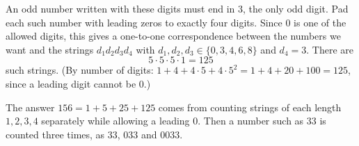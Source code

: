 An odd number written with these digits must end in $3$, the only odd digit. Pad each such number with leading zeros to exactly four digits. Since $0$ is one of the allowed digits, this gives a one-to-one correspondence between the numbers we want and the strings $d_1d_2d_3d_4$ with $d_1,d_2,d_3\in\{0,3,4,6,8\}$ and $d_4=3$. There are
\[
5\cdot5\cdot5\cdot1=\boxed{125}
\]
such strings. (By number of digits: $1+4+4\cdot5+4\cdot5^2=1+4+20+100=125$, since a leading digit cannot be $0$.)

The answer $156=1+5+25+125$ comes from counting strings of each length $1,2,3,4$ separately while allowing a leading $0$. Then a number such as $33$ is counted three times, as $33$, $033$ and $0033$.
